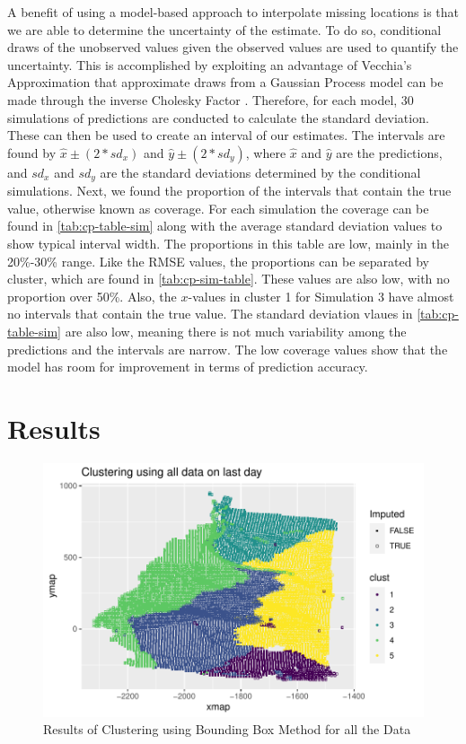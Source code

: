 \documentclass[12pt]{article}
\begin{document}
A benefit of using a model-based approach to interpolate missing
locations is that we are able to determine the uncertainty of the
estimate. To do so, conditional draws of the unobserved values given the
observed values are used to quantify the uncertainty. This is
accomplished by exploiting an advantage of Vecchia's Approximation that
approximate draws from a Gaussian Process model can be made through the
inverse Cholesky Factor \citep{guinness_permutation_2018}. Therefore,
for each model, 30 simulations of predictions are conducted to calculate
the standard deviation. These can then be used to create an interval of
our estimates. The intervals are found by \(\hat{x} \pm (2*sd_x)\) and
\(\hat{y} \pm (2*sd_y)\), where \(\hat{x}\) and \(\hat{y}\) are the
predictions, and \(sd_x\) and \(sd_y\) are the standard deviations
determined by the conditional simulations. Next, we found the proportion
of the intervals that contain the true value, otherwise known as
coverage. For each simulation the coverage can be found in
\cref{tab:cp-table-sim} along with the average standard deviation values
to show typical interval width. The proportions in this table are low,
mainly in the 20\%-30\% range. Like the RMSE values, the proportions can
be separated by cluster, which are found in \cref{tab:cp-sim-table}.
These values are also low, with no proportion over 50\%. Also, the
\(x\)-values in cluster 1 for Simulation 3 have almost no intervals that
contain the true value. The standard deviation vlaues in
\cref{tab:cp-table-sim} are also low, meaning there is not much
variability among the predictions and the intervals are narrow. The low
coverage values show that the model has room for improvement in terms of
prediction accuracy.

\hypertarget{results}{%
\section{Results}\label{results}}

\begin{figure}[tbp]

{\centering \includegraphics[width=\linewidth,]{spatio-temporal-model-arctic-sea-ice_files/figure-latex/ex-result-1} 

}

\caption{Results of Clustering using Bounding Box Method for all the Data}\label{fig:ex-result}
\end{figure}
\end{document}
